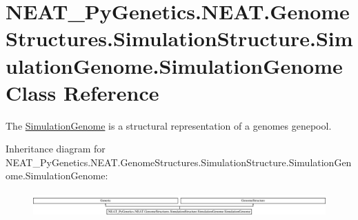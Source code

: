 \hypertarget{classNEAT__PyGenetics_1_1NEAT_1_1GenomeStructures_1_1SimulationStructure_1_1SimulationGenome_1_1SimulationGenome}{}\section{N\+E\+A\+T\+\_\+\+Py\+Genetics.\+N\+E\+A\+T.\+Genome\+Structures.\+Simulation\+Structure.\+Simulation\+Genome.\+Simulation\+Genome Class Reference}
\label{classNEAT__PyGenetics_1_1NEAT_1_1GenomeStructures_1_1SimulationStructure_1_1SimulationGenome_1_1SimulationGenome}


The \hyperlink{classNEAT__PyGenetics_1_1NEAT_1_1GenomeStructures_1_1SimulationStructure_1_1SimulationGenome_1_1SimulationGenome}{Simulation\+Genome} is a structural representation of a genome\textquotesingle{}s genepool.  


Inheritance diagram for N\+E\+A\+T\+\_\+\+Py\+Genetics.\+N\+E\+A\+T.\+Genome\+Structures.\+Simulation\+Structure.\+Simulation\+Genome.\+Simulation\+Genome\+:\begin{figure}[H]
\begin{center}
\leavevmode
\includegraphics[height=0.939597cm]{classNEAT__PyGenetics_1_1NEAT_1_1GenomeStructures_1_1SimulationStructure_1_1SimulationGenome_1_1SimulationGenome}
\end{center}
\end{figure}
